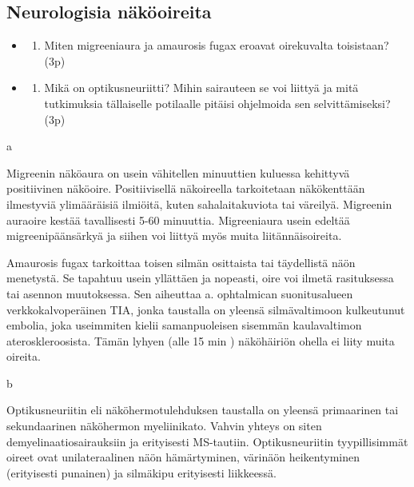 \documentclass[
]{book}
\providecommand{\tightlist}{%
  \setlength{\itemsep}{0pt}\setlength{\parskip}{0pt}}
\begin{document}
\subsection{Neurologisia näköoireita}\label{neurologisia-nuxe4kuxf6oireita}

\begin{itemize}
\tightlist
\item
  \begin{enumerate}
  \def\labelenumi{\alph{enumi}.}
  \tightlist
  \item
    Miten migreeniaura ja amaurosis fugax eroavat oirekuvalta toisistaan? (3p)
  \end{enumerate}
\item
  \begin{enumerate}
  \def\labelenumi{\alph{enumi}.}
  \setcounter{enumi}{1}
  \tightlist
  \item
    Mikä on optikusneuriitti? Mihin sairauteen se voi liittyä ja mitä tutkimuksia tällaiselle potilaalle pitäisi ohjelmoida sen selvittämiseksi? (3p)
  \end{enumerate}
\end{itemize}

a

Migreenin näköaura on usein vähitellen minuuttien kuluessa kehittyvä positiivinen näköoire. Positiivisellä näkoireella tarkoitetaan näkökenttään ilmestyviä ylimääräisiä ilmiöitä, kuten sahalaitakuviota tai väreilyä. Migreenin auraoire kestää tavallisesti 5-60 minuuttia. Migreeniaura usein edeltää migreenipäänsärkyä ja siihen voi liittyä myös muita liitännäisoireita.

Amaurosis fugax tarkoittaa toisen silmän osittaista tai täydellistä näön menetystä. Se tapahtuu usein yllättäen ja nopeasti, oire voi ilmetä rasituksessa tai asennon muutoksessa. Sen aiheuttaa a. ophtalmican suonitusalueen verkkokalvoperäinen TIA, jonka taustalla on yleensä silmävaltimoon kulkeutunut embolia, joka useimmiten kielii samanpuoleisen sisemmän kaulavaltimon ateroskleroosista. Tämän lyhyen (alle 15 min ) näköhäiriön ohella ei liity muita oireita.

b

Optikusneuriitin eli näköhermotulehduksen taustalla on yleensä primaarinen tai sekundaarinen näköhermon myeliinikato. Vahvin yhteys on siten demyelinaatiosairauksiin ja erityisesti MS-tautiin. Optikusneuriitin tyypillisimmät oireet ovat unilateraalinen näön hämärtyminen, värinäön heikentyminen (erityisesti punainen) ja silmäkipu erityisesti liikkeessä.
\end{document}
